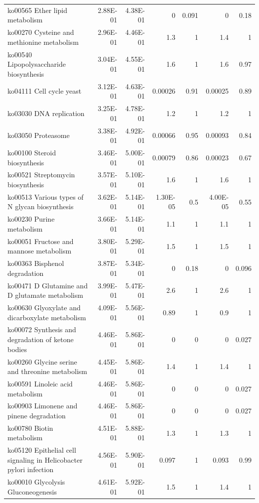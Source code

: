 {\begin{longtable}{ | l | r | r | r | r | r | r  | }
		ko00565 Ether lipid metabolism & 2.88E-01 & 4.38E-01 & 0 & 0.091 & 0 & 0.18\\ 
		ko00270 Cysteine and methionine metabolism & 2.96E-01 & 4.46E-01 & 1.3 & 1 & 1.4 & 1\\ 
		ko00540 Lipopolysaccharide biosynthesis & 3.04E-01 & 4.55E-01 & 1.6 & 1 & 1.6 & 0.97\\ 
		ko04111 Cell cycle yeast & 3.12E-01 & 4.63E-01 & 0.00026 & 0.91 & 0.00025 & 0.89\\ 
		ko03030 DNA replication & 3.25E-01 & 4.78E-01 & 1.2 & 1 & 1.2 & 1\\ 
		ko03050 Proteasome & 3.38E-01 & 4.92E-01 & 0.00066 & 0.95 & 0.00093 & 0.84\\ 
		ko00100 Steroid biosynthesis & 3.46E-01 & 5.00E-01 & 0.00079 & 0.86 & 0.00023 & 0.67\\ 
		ko00521 Streptomycin biosynthesis & 3.57E-01 & 5.10E-01 & 1.6 & 1 & 1.6 & 1\\ 
		ko00513 Various types of N glycan biosynthesis & 3.62E-01 & 5.14E-01 & 1.30E-05 & 0.5 & 4.00E-05 & 0.55\\ 
		ko00230 Purine metabolism & 3.66E-01 & 5.14E-01 & 1.1 & 1 & 1.1 & 1\\ 
		ko00051 Fructose and mannose metabolism & 3.80E-01 & 5.29E-01 & 1.5 & 1 & 1.5 & 1\\ 
		ko00363 Bisphenol degradation & 3.87E-01 & 5.34E-01 & 0 & 0.18 & 0 & 0.096\\ 
		ko00471 D Glutamine and D glutamate metabolism & 3.99E-01 & 5.47E-01 & 2.6 & 1 & 2.6 & 1\\ 
		ko00630 Glyoxylate and dicarboxylate metabolism & 4.09E-01 & 5.56E-01 & 0.89 & 1 & 0.9 & 1\\ 
		ko00072 Synthesis and degradation of ketone bodies & 4.46E-01 & 5.86E-01 & 0 & 0 & 0 & 0.027\\ 
		ko00260 Glycine serine and threonine metabolism & 4.45E-01 & 5.86E-01 & 1.4 & 1 & 1.4 & 1\\ 
		ko00591 Linoleic acid metabolism & 4.46E-01 & 5.86E-01 & 0 & 0 & 0 & 0.027\\ 
		ko00903 Limonene and pinene degradation & 4.46E-01 & 5.86E-01 & 0 & 0 & 0 & 0.027\\ 
		ko00780 Biotin metabolism & 4.51E-01 & 5.88E-01 & 1.3 & 1 & 1.3 & 1\\ 
		ko05120 Epithelial cell signaling in Helicobacter pylori infection & 4.56E-01 & 5.90E-01 & 0.097 & 1 & 0.093 & 0.99\\ 
		ko00010 Glycolysis Gluconeogenesis & 4.61E-01 & 5.92E-01 & 1.5 & 1 & 1.4 & 1\\ 

\end{longtable}}
